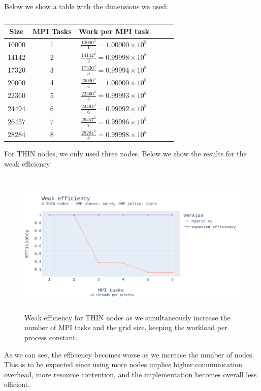 \documentclass{report}
\begin{document}
Below we show a table with the dimensions we used:

\begin{table}[H]
\centering
\begin{tabular}{|c|c|c|c|c|c|}
    \hline
    Size & MPI Tasks & Work per MPI task \\\hline
    10000 &    1     & $\frac{10000^2}{1}=1.00000\times 10^8$ \\
    14142 &    2     & $\frac{14142^2}{2}=0.99998\times 10^8$\\
    17320 &    3     & $\frac{17320^2}{3}=0.99994\times 10^8$ \\
    20000 &    4     & $\frac{20000^2}{4}=1.00000\times 10^8$\\
    22360 &    5     & $\frac{22360^2}{5}=0.99993\times 10^8$\\
    24494 &    6     & $\frac{24494^2}{6}=0.99992\times 10^8$\\
    26457 &    7     & $\frac{26457^2}{7}=0.99996\times 10^8$\\
    28284 &    8     & $\frac{28284^2}{8}=0.99998\times 10^8$\\ \hline
\end{tabular}
\caption{\label{tab:weak}}
\end{table}

For THIN nodes, we only used three nodes. Below we show the results for the 
weak efficiency:

\begin{figure}[H]
\centering
\includegraphics[width=14cm, height=7cm]{./images/weak_MPI_thin_hybrid.pdf}
\caption{\label{fig:weakmpithinhybrid} Weak efficiency for THIN nodes as 
we simultaneously increase the number of MPI tasks and the grid size, keeping the 
workload per process constant.}
\end{figure}

As we can see, the efficiency becomes worse as we increase the number of nodes. 
This is to be expected since using more nodes implies higher communication 
overhead, more resource contention, and the implementation becomes overall less 
efficient.
\end{document}

